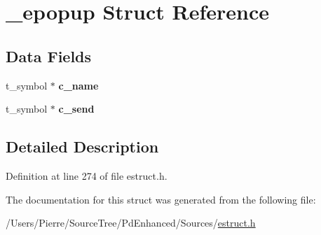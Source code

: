 \hypertarget{struct__epopup}{\section{\-\_\-epopup Struct Reference}
\label{struct__epopup}
}
\subsection*{Data Fields}
\begin{DoxyCompactItemize}
\item 
\hypertarget{struct__epopup_a6b1d595c3eed41231261cc949de6c059}{t\-\_\-symbol $\ast$ {\bfseries c\-\_\-name}}\label{struct__epopup_a6b1d595c3eed41231261cc949de6c059}

\item 
\hypertarget{struct__epopup_a8b8515ab22b24ef7b726fc06af1254fe}{t\-\_\-symbol $\ast$ {\bfseries c\-\_\-send}}\label{struct__epopup_a8b8515ab22b24ef7b726fc06af1254fe}

\end{DoxyCompactItemize}


\subsection{Detailed Description}


Definition at line 274 of file estruct.\-h.



The documentation for this struct was generated from the following file\-:\begin{DoxyCompactItemize}
\item 
/\-Users/\-Pierre/\-Source\-Tree/\-Pd\-Enhanced/\-Sources/\hyperlink{estruct_8h}{estruct.\-h}\end{DoxyCompactItemize}
